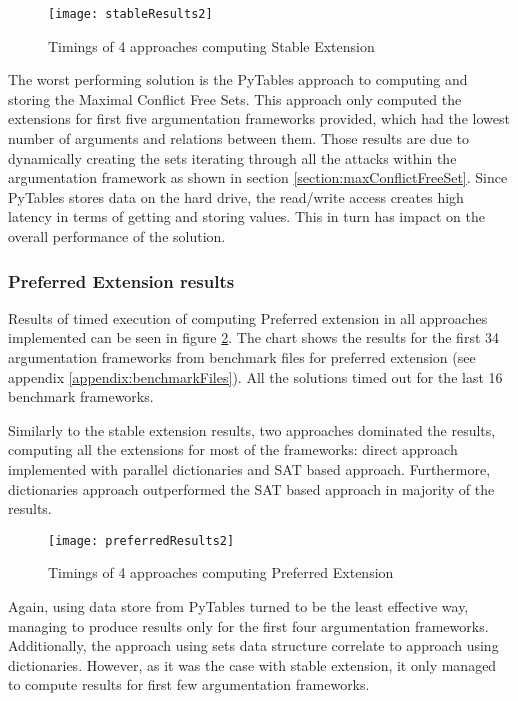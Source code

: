 \begin{landscape}
	\begin{figure}
		\texttt{[image: stableResults2]}
		\caption{Timings of 4 approaches computing Stable Extension}
		\label{fig:stableFinalResults}
	\end{figure}
\end{landscape}


The worst performing solution is the PyTables approach to computing and storing the Maximal Conflict Free Sets. This approach only computed the extensions for first five argumentation frameworks provided, which had the lowest number of arguments and relations between them. Those results are due to dynamically creating the sets iterating through all the attacks within the argumentation framework as shown in section \ref{section:maxConflictFreeSet}. Since PyTables stores data on the hard drive, the read/write access creates high latency in terms of getting and storing values. This in turn has impact on the overall performance of the solution. 	



\subsubsection{Preferred Extension results} \label{section:preferredExtensionResults}
Results of timed execution of computing Preferred extension in all approaches implemented can be seen in figure \ref{fig:preferredFinalResults}. The chart shows the results for the first 34 argumentation frameworks from benchmark files for preferred extension (see appendix \ref{appendix:benchmarkFiles}). All the solutions timed out for the last 16 benchmark frameworks.

Similarly to the stable extension results, two approaches dominated the results, computing all the extensions for most of the frameworks: direct approach implemented with parallel dictionaries and SAT based approach. Furthermore, dictionaries approach outperformed the SAT based approach in majority of the results. 

\begin{landscape}
	\begin{figure}[h]
		\texttt{[image: preferredResults2]}
		\caption{Timings of 4 approaches computing Preferred Extension}
		\label{fig:preferredFinalResults}
	\end{figure}
\end{landscape}

Again, using data store from PyTables turned to be the least effective way, managing to produce results only for the first four argumentation frameworks. Additionally, the approach using sets data structure correlate to approach using dictionaries. However, as it was the case with stable extension, it only managed to compute results for first few argumentation frameworks.


